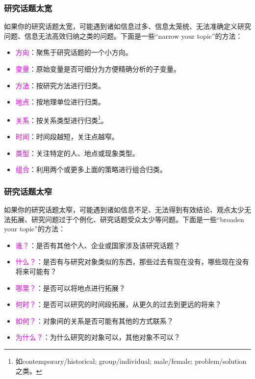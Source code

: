 \documentclass[cn,hazy,blue,14pt,screen]{elegantnote} %
\begin{document}
\subsubsection{研究话题太宽}

如果你的研究话题太宽，可能遇到诸如信息过多、信息太笼统、无法准确定义研究问题、信息无法高效归纳之类的问题。下面是一些“narrow your topic”的方法：

\begin{itemize}
  \item \textcolor{magenta}{方向}：聚焦于研究话题的一个小方向。
  \item \textcolor{magenta}{变量}：原始变量是否可细分为方便精确分析的子变量。
  \item \textcolor{magenta}{方法}：按研究方法进行归类。
  \item \textcolor{magenta}{地点}：按地理单位进行归类。
  \item \textcolor{magenta}{关系}：按关系类型进行归类\footnote{如contemporary/historical; group/individual; male/female; problem/solution之类。}。
  \item \textcolor{magenta}{时间}：时间段越短，关注点越窄。
  \item \textcolor{magenta}{类型}：关注特定的人、地点或现象类型。
  \item \textcolor{magenta}{组合}：利用两个或更多上面的策略进行组合归类。
\end{itemize}

\subsubsection{研究话题太窄}

如果你的研究话题太窄，可能遇到诸如信息不足、无法得到有效结论、观点太少无法拓展、研究问题过于个例化、研究话题受众太少等问题。下面是一些“broaden your topic”的方法：

\begin{itemize}
  \item \textcolor{magenta}{谁？}：是否有其他个人、企业或国家涉及该研究话题？
  \item \textcolor{magenta}{什么？}：是否有与研究对象类似的东西，那些过去有现在没有，哪些现在没有将来可能有？
  \item \textcolor{magenta}{哪里？}：是否可以将地点进行拓展？
  \item \textcolor{magenta}{何时？}：是否可以研究的时间段拓展，从更久的过去到更远的将来？
  \item \textcolor{magenta}{如何？}：对象间的关系是否可能有其他的方式联系？
  \item \textcolor{magenta}{为什么？}：为什么研究的对象可以，其他对象不可以？
\end{itemize}
\end{document}
